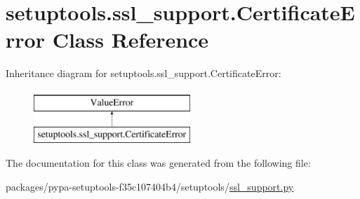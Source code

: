 \hypertarget{classsetuptools_1_1ssl__support_1_1CertificateError}{}\section{setuptools.\+ssl\+\_\+support.\+Certificate\+Error Class Reference}
\label{classsetuptools_1_1ssl__support_1_1CertificateError}
Inheritance diagram for setuptools.\+ssl\+\_\+support.\+Certificate\+Error\+:\begin{figure}[H]
\begin{center}
\leavevmode
\includegraphics[height=2.000000cm]{classsetuptools_1_1ssl__support_1_1CertificateError}
\end{center}
\end{figure}


The documentation for this class was generated from the following file\+:\begin{DoxyCompactItemize}
\item 
packages/pypa-\/setuptools-\/f35c107404b4/setuptools/\hyperlink{ssl__support_8py}{ssl\+\_\+support.\+py}\end{DoxyCompactItemize}
